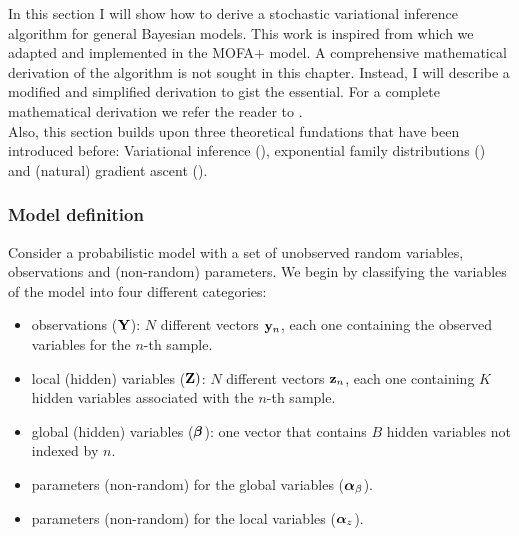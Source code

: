 In this section I will show how to derive a stochastic variational inference algorithm for general Bayesian models. This work is inspired from \cite{Hoffman2012} which we adapted and implemented in the MOFA+ model. A comprehensive mathematical derivation of the algorithm is not sought in this chapter. Instead, I will describe a modified and simplified derivation to gist the essential. For a complete mathematical derivation we refer the reader to \cite{Hoffman2012}.\\
Also, this section builds upon three theoretical fundations that have been introduced before: Variational inference (), exponential family distributions () and (natural) gradient ascent ().






\subsubsection{Model definition}

Consider a probabilistic model with a set of unobserved random variables, observations and (non-random) parameters. We begin by classifying the variables of the model into four different categories:

\begin{itemize}
	\item observations (${\bf Y}$): $N$ different vectors ${\bf y}_{n}$, each one containing the observed variables for the $n$-th sample.
	\item local (hidden) variables (${\bf Z})$: $N$ different vectors ${\bf z}_{n}$, each one containing $K$ hidden variables associated with the $n$-th sample.
	\item global (hidden) variables ($\mbox{\boldmath $\beta$}$): one vector that contains $B$ hidden variables not indexed by $n$.
	\item parameters (non-random) for the global variables ($\mbox{\boldmath $\alpha$}_{\beta}$).
	\item parameters (non-random) for the local variables ($\mbox{\boldmath $\alpha$}_{z}$).
\end{itemize}

